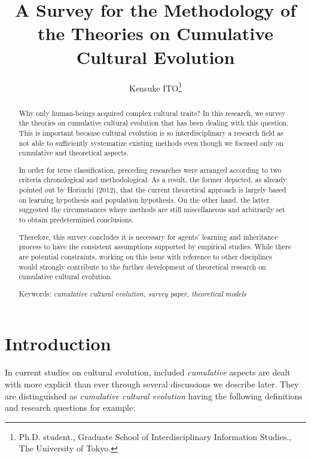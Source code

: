 \documentclass[a4paper, dvipdfmx]{article}
\title{A Survey for the Methodology of the Theories on Cumulative Cultural Evolution}
\author{Kensuke ITO\footnote{Ph.D. student., Graduate School of Interdisciplinary Information Studies., The University of Tokyo.}}
\date{}
\begin{document}
\maketitle

\begin{abstract}
    Why only human-beings acquired complex cultural traits? In this research, we survey the theories on cumulative cultural evolution that has been dealing with this question. This is important because cultural evolution is so interdisciplinary a research field as not able to sufficiently systematize existing methods even though we focused only on cumulative and theoretical aspects.

    In order for terse classification, preceding researches were arranged according to two criteria chronological and methodological. As a result, the former depicted, as already pointed out by Horiuchi (2012), that the current theoretical approach is largely based on learning hypothesis and population hypothesis. On the other hand, the latter suggested the circumstances where methods are still miscellaneous and arbitrarily set to obtain predetermined conclusions.

    Therefore, this survey concludes it is necessary for agents' learning and inheritance process to have the consistent assumptions supported by empirical studies. While there are potential constraints, working on this issue with reference to other disciplines would strongly contribute to the further development of theoretical research on cumulative cultural evolution.

    \begin{center}
        Keywords: {\it cumulative cultural evolution, survey paper, theoretical models}
    \end{center}
\end{abstract}

\section{Introduction}

In current studies on cultural evolution, included {\it cumulative} aspects are dealt with more explicit than ever through several discussions we describe later. They are distinguished as {\it cumulative cultural evolution} having the following definitions and research questions for example:
\end{document}
